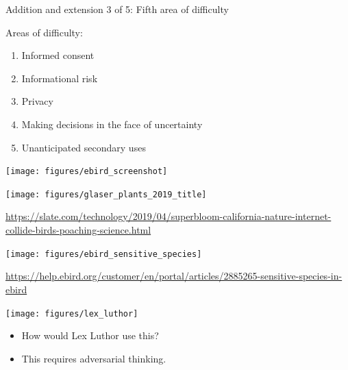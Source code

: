 \documentclass{beamer}
\begin{document}
\begin{frame}

\begin{center}
Addition and extension 3 of 5: Fifth area of difficulty
\end{center}

\end{frame}
\begin{frame}

Areas of difficulty:
\begin{enumerate}
\item Informed consent
\item Informational risk
\item Privacy
\item Making decisions in the face of uncertainty
\pause 
\item Unanticipated secondary uses
\end{enumerate}

\end{frame}
\begin{frame}

\begin{center}
\texttt{[image: figures/ebird\_screenshot]}
\end{center}

\end{frame}
\begin{frame}

\begin{center}
\texttt{[image: figures/glaser\_plants\_2019\_title]}
\end{center}

\vfill
\url{https://slate.com/technology/2019/04/superbloom-california-nature-internet-collide-birds-poaching-science.html}
\end{frame}
\begin{frame}

\begin{center}
\texttt{[image: figures/ebird\_sensitive\_species]}
\end{center}

\vfill
\url{https://help.ebird.org/customer/en/portal/articles/2885265-sensitive-species-in-ebird}
\end{frame}
\begin{frame}

\begin{center}
\texttt{[image: figures/lex\_luthor]}
\end{center}

\begin{itemize}
\item How would Lex Luthor use this?
\item This requires adversarial thinking.
\end{itemize}

\vfill
{}

\end{frame}
\end{document}

